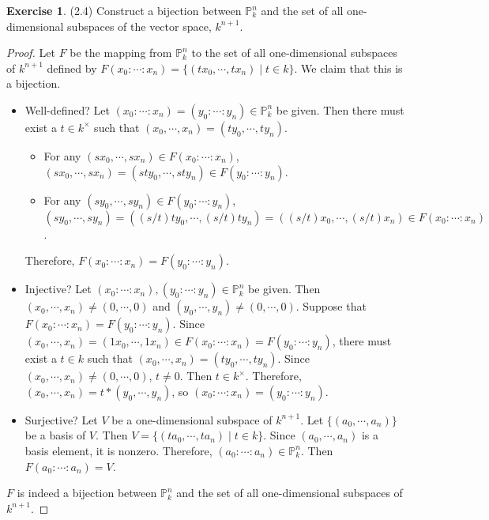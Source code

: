 \documentclass[12pt, psamsfonts]{amsart}
\theoremstyle{definition}
\newtheorem*{exer}{Exercise}
\theoremstyle{remark}
\numberwithin{equation}{section}
\begin{document}
\begin{exer}{(2.4)}
  Construct a bijection between $\mathbb{P}^n_k$ and the set of all one-dimensional subspaces of the vector space, $k^{n + 1}$.
\end{exer}

\begin{proof}
  Let $F$ be the mapping from $\mathbb{P}^n_k$ to the set of all one-dimensional subspaces of $k^{n + 1}$ defined by $F(x_0 : \cdots : x_n) = \{ (tx_0, \cdots, tx_n) \mid t \in k \}$.
  We claim that this is a bijection.
  \begin{itemize}
    \item
      Well-defined?
      Let $(x_0 : \cdots : x_n) = (y_0 : \cdots : y_n) \in \mathbb{P}^n_k$ be given.
      Then there must exist a $t \in k^{\times}$ such that $(x_0, \cdots, x_n) = (ty_0, \cdots, ty_n)$.
      \begin{itemize}
        \item
          For any $(sx_0, \cdots, sx_n) \in F(x_0 : \cdots : x_n)$, $(sx_0, \cdots, sx_n) = (sty_0, \cdots, sty_n) \in F(y_0 : \cdots : y_n)$.
        \item
          For any $(sy_0, \cdots, sy_n) \in F(y_0 : \cdots : y_n)$, $(sy_0, \cdots, sy_n) = ((s / t)ty_0, \cdots, (s / t)ty_n) = ((s / t)x_0, \cdots, (s / t)x_n) \in F(x_0 : \cdots : x_n)$.
      \end{itemize}
      Therefore, $F(x_0 : \cdots : x_n) = F(y_0 : \cdots : y_n)$.
    \item
      Injective?
      Let $(x_0 : \cdots : x_n), (y_0 : \cdots : y_n) \in \mathbb{P}^n_k$ be given.
      Then $(x_0, \cdots, x_n) \ne (0, \cdots, 0)$ and $(y_0, \cdots, y_n) \ne (0, \cdots, 0)$.
      Suppose that $F(x_0 : \cdots : x_n) = F(y_0 : \cdots : y_n)$.
      Since $(x_0, \cdots, x_n) = (1x_0, \cdots, 1x_n) \in F(x_0 : \cdots : x_n) = F(y_0 : \cdots : y_n)$, there must exist a $t \in k$ such that $(x_0, \cdots, x_n) = (ty_0, \cdots, ty_n)$.
      Since $(x_0, \cdots, x_n) \ne (0, \cdots, 0)$, $t \ne 0$.
      Then $t \in k^{\times}$.
      Therefore, $(x_0, \cdots, x_n) = t * (y_0, \cdots, y_n)$, so $(x_0 : \cdots : x_n) = (y_0 : \cdots : y_n)$.
    \item
      Surjective?
      Let $V$ be a one-dimensional subspace of $k^{n + 1}$.
      Let $\{ (a_0, \cdots, a_n) \}$ be a basis of $V$.
      Then $V = \{ (ta_0, \cdots, ta_n) \mid t \in k \}$.
      Since $(a_0, \cdots, a_n)$ is a basis element, it is nonzero.
      Therefore, $(a_0 : \cdots : a_n) \in \mathbb{P}^n_k$.
      Then $F(a_0 : \cdots : a_n) = V$.
  \end{itemize}
  $F$ is indeed a bijection between $\mathbb{P}^n_k$ and the set of all one-dimensional subspaces of $k^{n + 1}$.
\end{proof}
\end{document}
